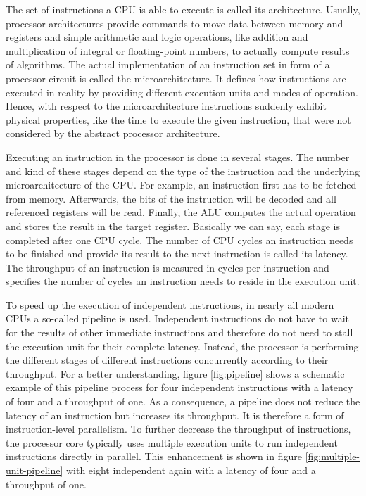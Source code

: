 \documentclass{stdlocal}
\begin{document}
    The set of instructions a CPU is able to execute is called its architecture.
    Usually, processor architectures provide commands to move data between memory and registers and simple arithmetic and logic operations, like addition and multiplication of integral or floating-point numbers, to actually compute results of algorithms.
    The actual implementation of an instruction set in form of a processor circuit is called the microarchitecture.
    It defines how instructions are executed in reality by providing different execution units and modes of operation.
    Hence, with respect to the microarchitecture instructions suddenly exhibit physical properties, like the time to execute the given instruction, that were not considered by the abstract processor architecture.
    \autocite{hennessy2019,patterson2014}

    Executing an instruction in the processor is done in several stages.
    The number and kind of these stages depend on the type of the instruction and the underlying microarchitecture of the CPU.
    For example, an instruction first has to be fetched from memory.
    Afterwards, the bits of the instruction will be decoded and all referenced registers will be read.
    Finally, the ALU computes the actual operation and stores the result in the target register.
    Basically we can say, each stage is completed after one CPU cycle.
    The number of CPU cycles an instruction needs to be finished and provide its result to the next instruction is called its latency.
    The throughput of an instruction is measured in cycles per instruction and specifies the number of cycles an instruction needs to reside in the execution unit.

    To speed up the execution of independent instructions, in nearly all modern CPUs a so-called pipeline is used.
    Independent instructions do not have to wait for the results of other immediate instructions and therefore do not need to stall the execution unit for their complete latency.
    Instead, the processor is performing the different stages of different instructions concurrently according to their throughput.
    For a better understanding, figure \ref{fig:pipeline} shows a schematic example of this pipeline process for four independent instructions with a latency of four and a throughput of one.
    As a consequence, a pipeline does not reduce the latency of an instruction but increases its throughput.
    It is therefore a form of instruction-level parallelism.
    To further decrease the throughput of instructions, the processor core typically uses multiple execution units to run independent instructions directly in parallel.
    This enhancement is shown in figure \ref{fig:multiple-unit-pipeline} with eight independent again with a latency of four and a throughput of one.
    \autocite{dolbeau2016,fog2019a}
\end{document}
